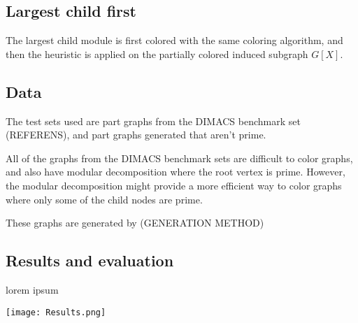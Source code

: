 \documentclass{amsart}
\begin{document}


\subsection{Largest child first}

The largest child module is first colored with the same coloring algorithm, and
then the heuristic is applied on the partially colored induced subgraph 
$G[X]$.


\subsection{Data}

The test sets used are part graphs from the DIMACS benchmark set (REFERENS), 
and part graphs generated that aren't prime.

All of the graphs from the DIMACS benchmark sets are difficult to color graphs,
and also have modular decomposition where the root vertex is prime. However, the
modular decomposition might provide a more efficient way to color graphs where
only some of the child nodes are prime. 

These graphs are generated by (GENERATION METHOD)

\subsection{Results and evaluation}

lorem ipsum

\texttt{[image: Results.png]}
\end{document}
